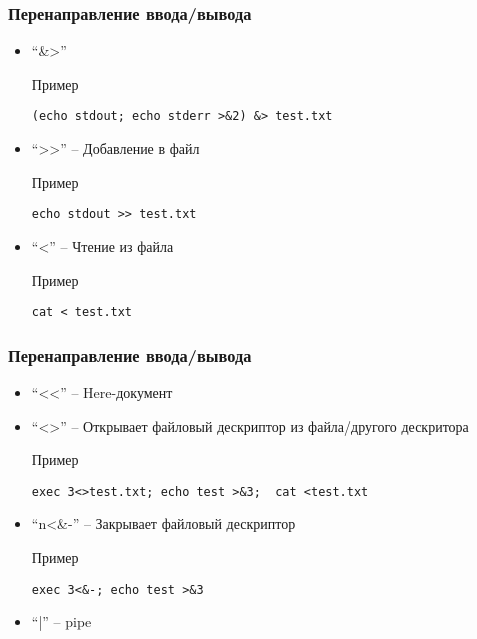 \begin{frame}[fragile]
	\frametitle{Перенаправление ввода/вывода}

	\begin{itemize}

		\item ``\&>''
			\begin{block}{Пример}
				\begin{lstlisting}
(echo stdout; echo stderr >&2) &> test.txt
				\end{lstlisting}
			\end{block}
		
		\item ``>>'' -- Добавление в файл
			\begin{block}{Пример}
				\begin{lstlisting}
echo stdout >> test.txt
				\end{lstlisting}
			\end{block}
																										                
		\item ``<'' -- Чтение из файла
			\begin{block}{Пример}
				\begin{lstlisting}
cat < test.txt
				\end{lstlisting}
			\end{block}
	\end{itemize}

\end{frame}


\begin{frame}[fragile]
	\frametitle{Перенаправление ввода/вывода}

	\begin{itemize}

		\item ``<<'' -- Here-документ

		\item ``<>'' -- Открывает файловый дескриптор из файла/другого дескритора
			\begin{block}{Пример}
				\begin{lstlisting}
exec 3<>test.txt; echo test >&3;  cat <test.txt
				\end{lstlisting}
			\end{block}
			
		\item ``n<\&-'' -- Закрывает файловый дескриптор
			\begin{block}{Пример}
				\begin{lstlisting}
exec 3<&-; echo test >&3
				\end{lstlisting}
			\end{block}
			
		\item ``|'' -- pipe
	\end{itemize}

\end{frame}


